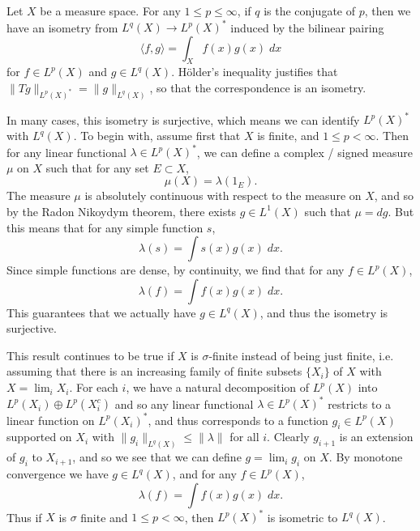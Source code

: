 \begin{example}
    Let $X$ be a measure space. For any $1 \leq p \leq \infty$, if $q$ is the conjugate of $p$, then we have an isometry from $L^q(X) \to L^p(X)^*$ induced by the bilinear pairing
    \[ \langle f, g \rangle = \int_X f(x) g(x)\; dx \]
    for $f \in L^p(X)$ and $g \in L^q(X)$. H\"{o}lder's inequality justifies that $\| Tg \|_{L^p(X)^*} = \| g \|_{L^q(X)}$, so that the correspondence is an isometry.

    In many cases, this isometry is surjective, which means we can identify $L^p(X)^*$ with $L^q(X)$. To begin with, assume first that $X$ is finite, and $1 \leq p < \infty$. Then for any linear functional $\lambda \in L^p(X)^*$, we can define a complex / signed measure $\mu$ on $X$ such that for any set $E \subset X$,
    \[ \mu(X) = \lambda(1_E). \]
    The measure $\mu$ is absolutely continuous with respect to the measure on $X$, and so by the Radon Nikoydym theorem, there exists $g \in L^1(X)$ such that $\mu = dg$. But this means that for any simple function $s$,
    \[ \lambda(s) = \int s(x) g(x)\; dx. \]
    Since simple functions are dense, by continuity, we find that for any $f \in L^p(X)$,
    \[ \lambda(f) = \int f(x) g(x)\; dx. \]
    This guarantees that we actually have $g \in L^q(X)$, and thus the isometry is surjective.

    This result continues to be true if $X$ is $\sigma$-finite instead of being just finite, i.e. assuming that there is an increasing family of finite subsets $\{ X_i \}$ of $X$ with $X = \lim_i X_i$. For each $i$, we have a natural decomposition of $L^p(X)$ into $L^p(X_i) \oplus L^p(X_i^c)$ and so any linear functional $\lambda \in L^p(X)^*$ restricts to a linear function on $L^p(X_i)^*$, and thus corresponds to a function $g_i \in L^p(X)$ supported on $X_i$ with $\| g_i \|_{L^q(X)} \leq \| \lambda \|$ for all $i$. Clearly $g_{i+1}$ is an extension of $g_i$ to $X_{i+1}$, and so we see that we can define $g = \lim_i g_i$ on $X$. By monotone convergence we have $g \in L^q(X)$, and for any $f \in L^p(X)$,
    \[ \lambda(f) = \int f(x) g(x)\; dx. \]
    Thus if $X$ is $\sigma$ finite and $1 \leq p < \infty$, then $L^p(X)^*$ is isometric to $L^q(X)$.


\end{example}
